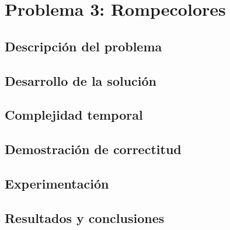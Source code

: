 \documentclass[a4paper, 10pt, twoside]{article}
\begin{document}
\newpage



\section{Problema 3: Rompecolores}

\subsection{Descripción del problema}


\subsection{Desarrollo de la solución}


\subsection{Complejidad temporal}


\subsection{Demostración de correctitud}
\label{problema3-demostracion}


\subsection{Experimentación}


\subsection{Resultados y conclusiones}


\newpage



\begin{appendices}



\end{appendices}
\end{document}
